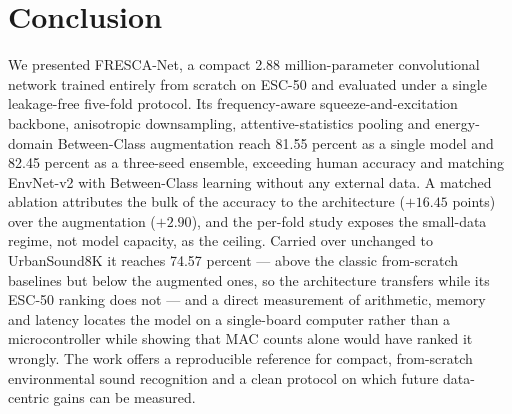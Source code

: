 \documentclass[conference]{IEEEtran}
\begin{document}
\section{Conclusion}
We presented FRESCA-Net, a compact 2.88 million-parameter convolutional network trained entirely from scratch on ESC-50 and evaluated under a single leakage-free five-fold protocol. Its frequency-aware squeeze-and-excitation backbone, anisotropic downsampling, attentive-statistics pooling and energy-domain Between-Class augmentation reach 81.55 percent as a single model and 82.45 percent as a three-seed ensemble, exceeding human accuracy and matching EnvNet-v2 with Between-Class learning without any external data. A matched ablation attributes the bulk of the accuracy to the architecture ($+16.45$ points) over the augmentation ($+2.90$), and the per-fold study exposes the small-data regime, not model capacity, as the ceiling. Carried over unchanged to UrbanSound8K it reaches 74.57 percent --- above the classic from-scratch baselines but below the augmented ones, so the architecture transfers while its ESC-50 ranking does not --- and a direct measurement of arithmetic, memory and latency locates the model on a single-board computer rather than a microcontroller while showing that MAC counts alone would have ranked it wrongly. The work offers a reproducible reference for compact, from-scratch environmental sound recognition and a clean protocol on which future data-centric gains can be measured.
\end{document}
